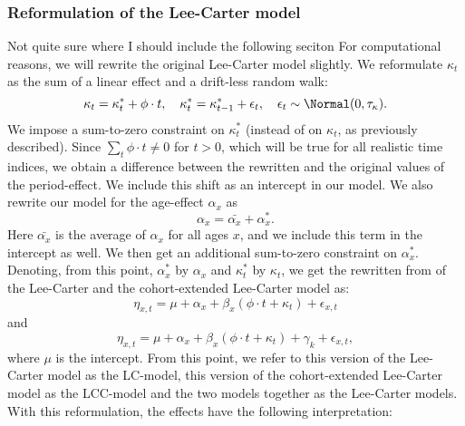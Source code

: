 \subsubsection{Reformulation of the Lee-Carter model}
\textcolor{myDarkGreen}{Not quite sure where I should include the following seciton}
For computational reasons, we will rewrite the original Lee-Carter model slightly. We reformulate $\kappa_t$ as the sum of a linear effect and a drift-less random walk:
\begin{equation}
    \kappa_t = \kappa_t^* + \phi\cdot t, \quad \kappa_t^* = \kappa_{t-1}^* + \epsilon_t, \quad \epsilon_t \sim \Normal(0,\tau_{\kappa}).
\end{equation}
We impose a sum-to-zero constraint on $\kappa_t^*$ (instead of on $\kappa_t$, as previously described). Since $\sum_t \phi \cdot t \neq 0$ for $t > 0$, which will be true for all realistic time indices, we obtain a difference between the rewritten and the original values of the period-effect. We include this shift as an intercept in our model. We also rewrite our model for the age-effect $\alpha_x$ as 
\begin{equation}
    \alpha_x = \bar{\alpha_x} + \alpha_x^*.
\end{equation}
Here $\bar{\alpha_x}$ is the average of $\alpha_x$ for all ages $x$, and we include this term in the intercept as well. We then get an additional sum-to-zero constraint on $\alpha_x^*$. Denoting, from this point, $\alpha_x^*$ by $\alpha_x$ and $\kappa_t^*$ by $\kappa_t$, we get the rewritten from of the Lee-Carter and the cohort-extended Lee-Carter model as:
\begin{equation}
    \eta_{x,t} = \mu + \alpha_x + \beta_x(\phi \cdot t + \kappa_t) + \epsilon_{x,t}
    \label{eq:LC-rewritten}
\end{equation}
and
\begin{equation}
    \eta_{x,t} = \mu + \alpha_x + \beta_x(\phi \cdot t + \kappa_t) + \gamma_k + \epsilon_{x,t},
    \label{eq:LCC-rewritten}
\end{equation}
where $\mu$ is the intercept. From this point, we refer to this version of the Lee-Carter model as the LC-model, this version of the cohort-extended Lee-Carter model as the LCC-model and the two models together as the Lee-Carter models. With this reformulation, the effects have the following interpretation:
